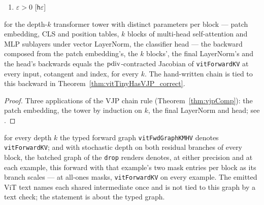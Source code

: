 \begin{theorem}
  \label{thm:vitForwardKVHasVJP}
  \leanok
  \Assume{}
  \begin{enumerate}
    \item \(\varepsilon > 0\) \hfill[\texttt{h\(\varepsilon\)}]
  \end{enumerate}
  \Prove{} for the depth-\(k\) transformer tower with distinct parameters per
  block --- patch embedding, CLS and position tables, \(k\) blocks of
  multi-head self-attention and MLP sublayers under vector LayerNorm, the
  classifier head --- the backward composed from the patch embedding's, the
  \(k\) blocks', the final LayerNorm's and the head's backwards equals the
  \(\operatorname{pdiv}\)-contracted Jacobian of \texttt{vitForwardKV} at every input,
  cotangent and index, for every \(k\). The hand-written chain is tied to
  this backward in Theorem~\ref{thm:vitTinyHasVJP_correct}.
\end{theorem}

\begin{proof}
\leanok
Three applications of the VJP chain rule (Theorem~\ref{thm:vjpComp}): the
patch embedding, the tower by induction on \(k\), the final LayerNorm and
head; see .
\end{proof}

\begin{theorem}
  \label{thm:vitFwdGraphKMHV_faithful}
  \leanok
  \Prove{} for every depth \(k\) the typed forward graph
  \texttt{vitFwdGraphKMHV} denotes \texttt{vitForwardKV}; and with stochastic
  depth on both residual branches of every block, the batched graph of the
  \texttt{drop} renders denotes, at either precision and at each example,
  this forward with that
  example's two mask entries per block as its branch scales --- at all-ones
  masks, \texttt{vitForwardKV} on every example. The emitted ViT text names
  each shared intermediate once and is not tied to this graph by a text
  check; the statement is about the typed graph.
\end{theorem}

